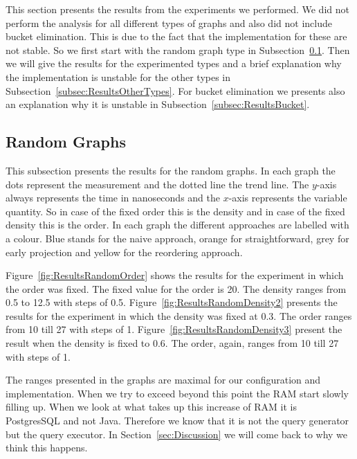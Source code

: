 This section presents the results from the experiments we performed. We did not perform the analysis for all different types of graphs and also did not include bucket elimination. This is due to the fact that the implementation for these are not stable. So we first start with the random graph type in Subsection~\ref{subsec:ResultsRandom}. Then we will give the results for the experimented types and a brief explanation why the implementation is unstable for the other types in Subsection~\ref{subsec:ResultsOtherTypes}. For bucket elimination we presents also an explanation why it is unstable in Subsection~\ref{subsec:ResultsBucket}. 

\subsection{Random Graphs} \label{subsec:ResultsRandom}
This subsection presents the results for the random graphs. In each graph the dots represent the measurement and the dotted line the trend line. The $y$-axis always represents the time in nanoseconds and the $x$-axis represents the variable quantity. So in case of the fixed order this is the density and in case of the fixed density this is the order. In each graph the different approaches are labelled with a colour. Blue stands for the naive approach, orange for straightforward, grey for early projection and yellow for the reordering approach.

  Figure~\ref{fig:ResultsRandomOrder} shows the results for the experiment in which the order was fixed. The fixed value for the order is 20. The density ranges from 0.5 to 12.5 with steps of 0.5. Figure~\ref{fig:ResultsRandomDensity2} presents the results for the experiment in which the density was fixed at 0.3. The order ranges from 10 till 27 with steps of 1. Figure~\ref{fig:ResultsRandomDensity3} present the result when the density is fixed to 0.6. The order, again, ranges from 10 till 27 with steps of 1. 
  
 The ranges presented in the graphs are maximal for our configuration and implementation. When we try to exceed beyond this point the RAM start slowly filling up. When we look at what takes up this increase of RAM it is PostgresSQL and not Java. Therefore we know that it is not the query generator but the query executor. In Section~\ref{sec:Discussion} we will come back to why we think this happens. 

